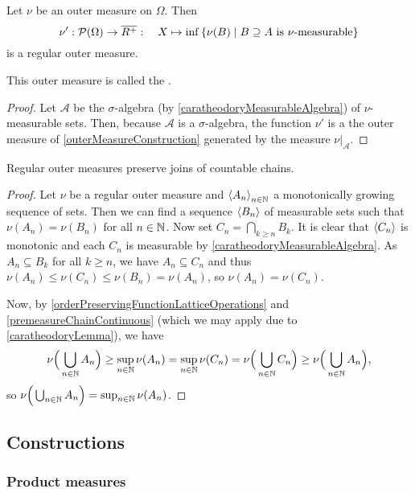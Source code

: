 \begin{corollary}
Let $\nu$ be an outer measure on $\Omega$. Then
\[ \nu': \powerset(\Omega) \to \overline{R^+}:\quad X\mapsto  \inf\setbuilder{\nu(B)}{\text{$B\supseteq A$ is $\nu$-measurable}} \]
is a regular outer measure.
\end{corollary}
This outer measure is called the .
\begin{proof}
Let $\mathcal{A}$ be the $\sigma$-algebra (by \ref{caratheodoryMeasurableAlgebra}) of $\nu$-measurable sets. Then, because $\mathcal{A}$ is a $\sigma$-algebra, the function $\nu'$ is a the outer measure of \ref{outerMeasureConstruction} generated by the measure $\nu|_\mathcal{A}$.
\end{proof}

\begin{proposition}
Regular outer measures preserve joins of countable chains.
\end{proposition}
\begin{proof}
Let $\nu$ be a regular outer measure and $\left\langle A_n \right\rangle_{n\in\mathbb{N}}$ a monotonically growing sequence of sets. Then we can find a sequence $\left\langle B_n \right\rangle$ of measurable sets such that $\nu(A_n) = \nu(B_n)$ for all $n\in\mathbb{N}$. Now set $C_n = \bigcap_{k \geq n}B_k$. It is clear that $\left\langle C_n \right\rangle$ is monotonic and each $C_n$ is measurable by \ref{caratheodoryMeasurableAlgebra}. As $A_n\subseteq B_k$ for all $k\geq n$, we have $A_n\subseteq C_n$ and thus $\nu(A_n) \leq \nu(C_n) \leq \nu(B_n) = \nu(A_n)$, so $\nu(A_n) = \nu(C_n)$. 

Now, by \ref{orderPreservingFunctionLatticeOperations} and \ref{premeasureChainContinuous} (which we may apply due to \ref{caratheodoryLemma}), we have
\[ \nu\Big(\bigcup_{n\in\mathbb{N}}A_n\Big) \geq \sup_{n\in \mathbb{N}}\nu(A_n) = \sup_{n\in \mathbb{N}}\nu(C_n) = \nu\Big(\bigcup_{n\in\mathbb{N}}C_n\Big) \geq \nu\Big(\bigcup_{n\in\mathbb{N}}A_n\Big), \]
so $\nu\Big(\bigcup_{n\in\mathbb{N}}A_n\Big) = \sup_{n\in \mathbb{N}}\nu(A_n)$.
\end{proof}

\subsection{Constructions}
\subsubsection{Product measures}

